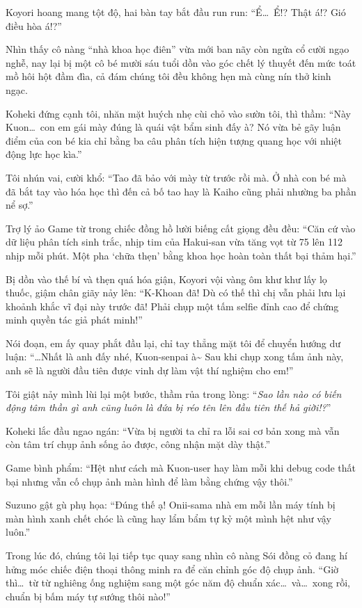 \documentclass[../main.tex]{subfiles}
\begin{document}
Koyori hoang mang tột độ, hai bàn tay bắt đầu run run: ``Ể\dots\ Ể!? Thật á!? Gió điều hòa á!?''

Nhìn thấy cô nàng ``nhà khoa học điên'' vừa mới ban nãy còn ngửa cổ cười ngạo nghễ, nay lại bị một cô bé mười sáu tuổi dồn vào góc chết lý thuyết đến mức toát mồ hôi hột đầm đìa, cả đám chúng tôi đều không hẹn mà cùng nín thở kinh ngạc.

Koheki đứng cạnh tôi, nhăn mặt huých nhẹ cùi chỏ vào sườn tôi, thì thầm: ``Này Kuon\dots\ con em gái mày đúng là quái vật bẩm sinh đấy à? Nó vừa bẻ gãy luận điểm của con bé kia chỉ bằng ba câu phân tích hiện tượng quang học với nhiệt động lực học kìa.''

Tôi nhún vai, cười khổ: ``Tao đã bảo với mày từ trước rồi mà. Ở nhà con bé mà đã bắt tay vào hóa học thì đến cả bố tao hay là Kaiho cũng phải nhường ba phần nể sợ.''

Trợ lý ảo Game từ trong chiếc đồng hồ lười biếng cất giọng đều đều: ``Căn cứ vào dữ liệu phân tích sinh trắc, nhịp tim của Hakui-san vừa tăng vọt từ 75 lên 112 nhịp mỗi phút. Một pha `chữa thẹn' bằng khoa học hoàn toàn thất bại thảm hại.''

Bị dồn vào thế bí và thẹn quá hóa giận, Koyori vội vàng ôm khư khư lấy lọ thuốc, giậm chân giãy nảy lên: ``K-Khoan đã! Dù có thế thì chị vẫn phải lưu lại khoảnh khắc vĩ đại này trước đã! Phải chụp một tấm selfie đỉnh cao để chứng minh quyền tác giả phát minh!''

Nói đoạn, em ấy quay phắt đầu lại, chỉ tay thẳng mặt tôi để chuyển hướng dư luận: ``\dots Nhất là anh đấy nhé, Kuon-senpai à\~{} Sau khi chụp xong tấm ảnh này, anh sẽ là người đầu tiên được vinh dự làm vật thí nghiệm cho em!''

Tôi giật nảy mình lùi lại một bước, thầm rủa trong lòng: ``\textit{Sao lần nào có biến động tâm thần gì anh cũng luôn là đứa bị réo tên lên đầu tiên thế hả giời!?}''

Koheki lắc đầu ngao ngán: ``Vừa bị người ta chỉ ra lỗi sai cơ bản xong mà vẫn còn tâm trí chụp ảnh sống ảo được, công nhận mặt dày thật.''

Game bình phẩm: ``Hệt như cách mà Kuon-user hay làm mỗi khi debug code thất bại nhưng vẫn cố chụp ảnh màn hình để làm bằng chứng vậy thôi.''

Suzuno gật gù phụ họa: ``Đúng thế ạ! Onii-sama nhà em mỗi lần máy tính bị màn hình xanh chết chóc là cũng hay lẩm bẩm tự kỷ một mình hệt như vậy luôn.''

Trong lúc đó, chúng tôi lại tiếp tục quay sang nhìn cô nàng Sói đồng cỏ đang hí hửng móc chiếc điện thoại thông minh ra để căn chỉnh góc độ chụp ảnh. ``Giờ thì\dots\ từ từ nghiêng ống nghiệm sang một góc năm độ chuẩn xác\dots\ và\dots\ xong rồi, chuẩn bị bấm máy tự sướng thôi nào!''
\end{document}

